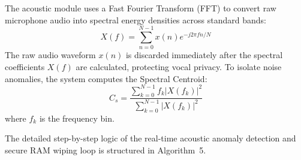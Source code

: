\documentclass[12pt,a4paper,oneside]{report}
\begin{document}
The acoustic module uses a Fast Fourier Transform (FFT) to convert raw microphone audio into spectral energy densities across standard bands:
\begin{equation}
    X(f) = \sum_{n=0}^{N-1} x(n) e^{-j 2 \pi f n / N}
\end{equation}
The raw audio waveform $x(n)$ is discarded immediately after the spectral coefficients $X(f)$ are calculated, protecting vocal privacy. To isolate noise anomalies, the system computes the Spectral Centroid:
\begin{equation}
    C_s = \frac{\sum_{k=0}^{N-1} f_k |X(f_k)|^2}{\sum_{k=0}^{N-1} |X(f_k)|^2}
\end{equation}
where $f_k$ is the frequency bin.

The detailed step-by-step logic of the real-time acoustic anomaly detection and secure RAM wiping loop is structured in Algorithm~5.
\end{document}
